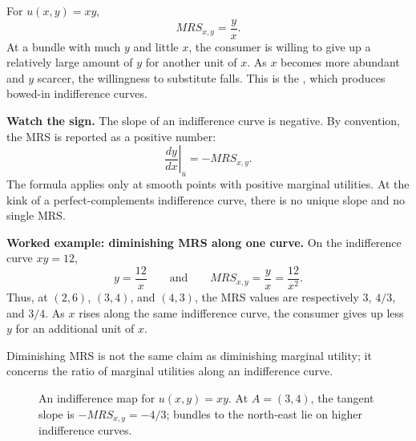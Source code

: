 For $u(x,y)=xy$,
\[
MRS_{x,y}=\frac{y}{x}.
\]
At a bundle with much $y$ and little $x$, the consumer is willing to give up a
relatively large amount of $y$ for another unit of $x$. As $x$ becomes more
abundant and $y$ scarcer, the willingness to substitute falls. This is the
, which produces bowed-in
indifference curves.

\begin{keyidea}
\textbf{Watch the sign.} The slope of an indifference curve is negative. By
convention, the MRS is reported as a positive number:
\[
\left.\frac{dy}{dx}\right|_{\bar u}=-MRS_{x,y}.
\]
The formula applies only at smooth points with positive marginal utilities. At
the kink of a perfect-complements indifference curve, there is no unique slope
and no single MRS.
\end{keyidea}

\begin{exercisebox}
\textbf{Worked example: diminishing MRS along one curve.} On the indifference
curve $xy=12$,
\[
y=\frac{12}{x}
\qquad\text{and}\qquad
MRS_{x,y}=\frac{y}{x}=\frac{12}{x^2}.
\]
Thus, at $(2,6)$, $(3,4)$, and $(4,3)$, the MRS values are respectively
$3$, $4/3$, and $3/4$. As $x$ rises along the same indifference curve, the
consumer gives up less $y$ for an additional unit of $x$.
\end{exercisebox}

Diminishing MRS is not the same claim as diminishing marginal utility; it
concerns the ratio of marginal utilities along an indifference curve.

\begin{figure}[!ht]
\centering
{}
\caption{An indifference map for $u(x,y)=xy$. At $A=(3,4)$, the tangent
slope is $-MRS_{x,y}=-4/3$; bundles to the north-east lie on higher
indifference curves.}
\label{fig:indifference-map-mrs}
\end{figure}

